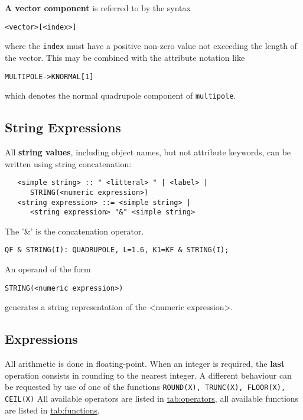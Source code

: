 \documentclass{article}
\newcommand{\tabref}[2]{\hyperref{#1}{#1 (see Table~}{)}{tab:#2}}
\begin{document}
\textbf{A vector component} is referred to by the syntax
\begin{verbatim}
<vector>[<index>]
\end{verbatim}
where the \texttt{index} must have a positive non-zero value not
exceeding the length of the vector.
This may be combined with the attribute notation like
\begin{verbatim}
MULTIPOLE->KNORMAL[1]
\end{verbatim}
which denotes the normal quadrupole component of \texttt{multipole}.

\subsection{String Expressions}
\label{sec:string}
All \textbf{string values}, including object names,
but not attribute keywords,
can be written using string concatenation:
\begin{verbatim}
   <simple string> :: " <litteral> " | <label> |
      STRING(<numeric expression>)
   <string expression> ::= <simple string> |
      <string expression> "&" <simple string>
\end{verbatim}
The '\&' is the concatenation operator.
\begin{verbatim}
QF & STRING(I): QUADRUPOLE, L=1.6, K1=KF & STRING(I);
\end{verbatim}
An operand of the form
\begin{verbatim}
STRING(<numeric expression>)
\end{verbatim}
generates a string representation of the <numeric expression>.

\subsection{Expressions}
All arithmetic is done in floating-point.
When an integer is required, the \textbf{last} operation consists in rounding
to the nearest integer.
A different behaviour can be requested by use of one of the functions
\texttt{ROUND(X), TRUNC(X), FLOOR(X), CEIL(X)}
All available operators are listed in \tabref{operators}{operators},
all available functions are listed in \tabref{functions}{functions},
\end{document}
